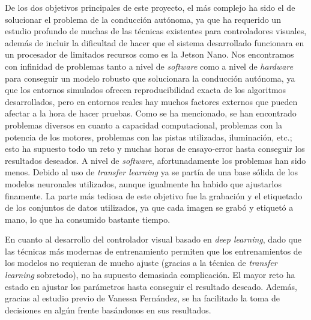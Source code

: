 De los dos objetivos principales de este proyecto, el más complejo ha sido el de solucionar el problema de la conducción autónoma, ya que ha requerido un estudio profundo de muchas de las técnicas existentes para controladores visuales, además de incluir la dificultad de hacer que el sistema desarrollado funcionara en un procesador de limitados recursos como es la Jetson Nano. Nos encontramos con infinidad de problemas tanto a nivel de \textit{software} como a nivel de \textit{hardware} para conseguir un modelo robusto que solucionara la conducción autónoma, ya que los entornos simulados ofrecen reproducibilidad exacta de los algoritmos desarrollados, pero en entornos reales hay muchos factores externos que pueden afectar a la hora de hacer pruebas. Como se ha mencionado, se han encontrado problemas diversos en cuanto a capacidad computacional, problemas con la potencia de los motores, problemas con las pistas utilizadas, iluminación, etc.; esto ha supuesto todo un reto y muchas horas de ensayo-error hasta conseguir los resultados deseados. A nivel de \textit{software}, afortunadamente los problemas han sido menos. Debido al uso de \textit{transfer learning} ya se partía de una base sólida de los modelos neuronales utilizados, aunque igualmente ha habido que ajustarlos finamente. La parte más tediosa de este objetivo fue la grabación y el etiquetado de los conjuntos de datos utilizados, ya que cada imagen se grabó y etiquetó a mano, lo que ha consumido bastante tiempo.

En cuanto al desarrollo del controlador visual basado en \textit{deep learning}, dado que las técnicas más modernas de entrenamiento permiten que los entrenamientos de los modelos no requieran de mucho ajuste (gracias a la técnica de \textit{transfer learning} sobretodo), no ha supuesto demasiada complicación. El mayor reto ha estado en ajustar los parámetros hasta conseguir el resultado deseado. Además, gracias al estudio previo de Vanessa Fernández, se ha facilitado la toma de decisiones en algún frente basándonos en sus resultados. 

